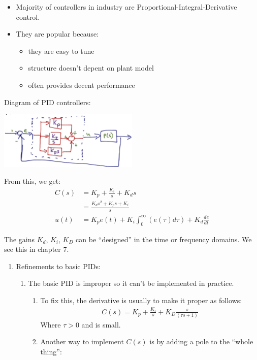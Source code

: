 \begin{enumerate}
            \begin{itemize}
                \item Majority of controllers in industry are Proportional-Integral-Derivative control.
                \item They are popular because:
                    \begin{itemize}
                         \item they are easy to tune
                         \item structure doesn't depent on plant model
                         \item often provides decent performance
                     \end{itemize}
            \end{itemize}

            Diagram of PID controllers:

            \begin{center}\includegraphics[width=0.5\textwidth,keepaspectratio]{images/5-8.png}\end{center}

            From this, we get:
            \begin{align*}
                C(s)&= K_p + \frac{K_i}{s} + K_d s \\
                    &= \frac{K_d s^2 + K_p s + K_i}{s} \\
                u(t) &= K_p e(t) + K_i \int_0^{\infty} {(e(\tau) d\tau)} + K_d \frac{de}{dt}
            \end{align*}

            The gains $K_d$, $K_i$, $K_D$ can be ``designed'' in the time or frequency domains. We see this in chapter 7.

            \begin{enumerate}
                \item Refinements to basic PIDs:
                    \begin{enumerate}
                        \item The basic PID is improper so it can't be implemented in practice.
                            \begin{enumerate}
                                \item To fix this, the derivative is usually to make it proper as follows:
                                    \begin{align*}
                                        C(s) = K_p + \frac{K_i}{s} + K_D \frac{s}{(\tau s + 1)}
                                    \end{align*}
                                    Where $\tau>0$ and is small.
                                \item Another way to implement $C(s)$ is by adding a pole to the ``whole thing'':


\end{enumerate}
\end{enumerate}
\end{enumerate}
\end{enumerate}
